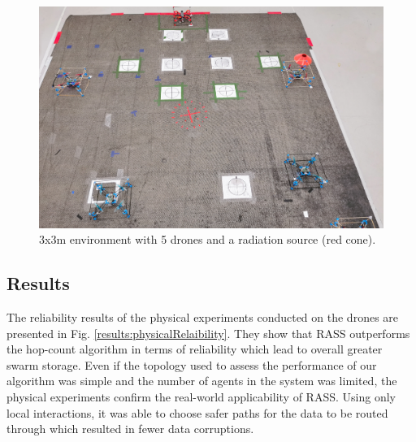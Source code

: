 \documentclass[sigconf]{aamas}
\begin{document}
\begin{figure}[h]
	\centering
    \includegraphics[width=0.95\columnwidth]{figures/cognifly.jpg}
    \caption{3x3m environment with 5 drones and a radiation source (red cone).}
    \label{cogniflyExperiment}
\vspace{-2mm}
\end{figure}


\subsection{Results}
The reliability results of the physical experiments conducted on the drones are presented in Fig. \ref{results:physicalRelaibility}. They show that RASS outperforms the hop-count algorithm in terms of reliability which lead to overall greater swarm storage. Even if the topology used to assess the performance of our algorithm was simple and the number of agents in the system was limited, the physical experiments confirm the real-world applicability of RASS. Using only local interactions, it was able to choose safer paths for the data to be routed through which resulted in fewer data corruptions.
\end{document}
